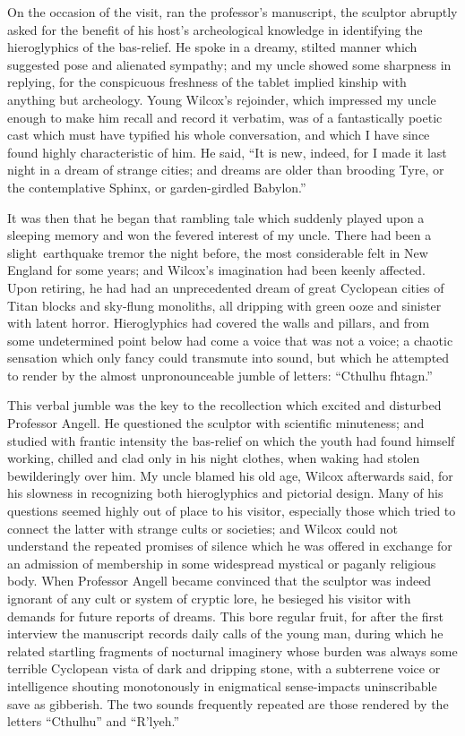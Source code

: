 On the occasion of the visit, ran the professor's manuscript, the
sculptor abruptly asked for the benefit of his host's archeological
knowledge in identifying the hieroglyphics of the bas-relief. He spoke
in a dreamy, stilted manner which suggested pose and alienated sympathy;
and my uncle showed some sharpness in replying, for the conspicuous
freshness of the tablet implied kinship with anything but archeology.
Young Wilcox's rejoinder, which impressed my uncle enough to make him
recall and record it verbatim, was of a fantastically poetic cast which
must have typified his whole conversation, and which I have since found
highly characteristic of him. He said, ``It is new, indeed, for I made
it last night in a dream of strange cities; and dreams are older than
brooding Tyre, or the contemplative Sphinx, or garden-girdled Babylon.''

It was then that he began that rambling tale which suddenly played upon
a sleeping memory and won the fevered interest of my uncle. There had been a slight\est\ earthquake tremor the night before, the most considerable
felt in New England for some years; and Wilcox's imagination had been
keenly affected. Upon retiring, he had had an unprecedented dream of
great Cyclopean cities of Titan blocks and sky-flung monoliths, all
dripping with green ooze
and sinister with latent horror. Hieroglyphics
had covered the walls and pillars, and from some undetermined point
below had come a voice that was not a voice; a chaotic sensation which
only fancy could transmute into sound, but which he attempted to render
by the almost unpronounceable jumble of letters: ``Cthulhu fhtagn.''

This verbal jumble was the key to the recollection which excited and
disturbed Professor Angell. He questioned the sculptor with scientific
minuteness; and studied with frantic intensity the bas-relief on which
the youth had found himself working, chilled and clad only in his night
clothes, when waking had stolen bewilderingly over him. My uncle blamed
his old age, Wilcox afterwards said, for his slowness in recognizing
both hieroglyphics and pictorial design. Many of his questions seemed
highly out of place to his visitor, especially those which tried to
connect the latter with strange cults or societies; and Wilcox could not
understand the repeated promises of silence which he was offered in
exchange for an admission of membership in some widespread mystical or
paganly religious body. When Professor Angell became convinced that the
sculptor was indeed ignorant of any cult or system of cryptic lore, he
besieged his visitor with demands for future reports of dreams. This
bore regular fruit, for after the first interview the manuscript records
daily calls of the young man, during which he related startling
fragments of nocturnal imaginery whose burden was always some terrible
Cyclopean vista of dark and dripping stone, with a subterrene voice or
intelligence shouting monotonously in enigmatical sense-impacts
uninscribable save as gibberish. The two sounds frequently repeated are
those rendered by the letters ``Cthulhu'' and ``R'lyeh.''

